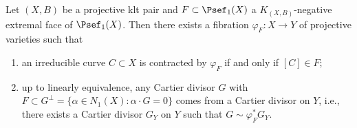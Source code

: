     \begin{remark}\label{rmk:extremal_ray_may_not_be_exposed}
    \end{remark}


    \begin{theorem}\label{thm: contraction theorem}
        Let \((X,B)\) be a projective klt pair and \(F \subset \Psef_1(X)\) a \(K_{(X,B)}\)-negative extremal face of \(\Psef_1(X)\).
        Then there exists a fibration \(\varphi_F: X \to Y\) of projective varieties such that
        \begin{enumerate}
            \item an irreducible curve \(C \subset X\) is contracted by \(\varphi_F\) if and only if \([C] \in F\);
            \item up to linearly equivalence, any Cartier divisor \(G\) with \(F \subset G^{\perp} = \{\alpha \in N_1(X) : \alpha \cdot G= 0\}\) comes from a Cartier divisor on \(Y\), 
                i.e., there exists a Cartier divisor \(G_Y\) on \(Y\) such that \(G \sim \varphi_F^* G_Y\).
        \end{enumerate}
    \end{theorem}
